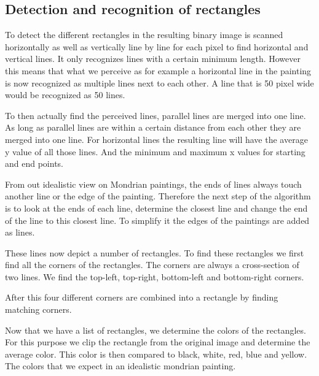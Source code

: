 \subsection{Detection and recognition of rectangles}

To detect the different rectangles in the resulting binary image is scanned
horizontally as well as vertically line by line for each pixel to find horizontal
and vertical lines. It only recognizes lines with a certain minimum length.
However this means that what we perceive as for example a horizontal line in the
painting is now recognized as multiple lines next to each other. A line that is
50 pixel wide would be recognized as 50 lines.

To then actually find the perceived lines, parallel lines are merged into one line.
As long as parallel lines are within a certain distance from each other they are
merged into one line. For horizontal lines the resulting line will have the average
y value of all those lines. And the minimum and maximum x values for starting and end
points.

From out idealistic view on Mondrian paintings, the ends of lines always touch
another line or the edge of the painting. Therefore the next step of the algorithm
is to look at the ends of each line, determine the closest line and change the
end of the line to this closest line. To simplify it the edges of the paintings
are added as lines.

These lines now depict a number of rectangles. To find these rectangles we
first find all the corners of the rectangles. The corners are always a cross-section
of two lines. We find the top-left, top-right, bottom-left and bottom-right corners.

After this four different corners are combined into a rectangle by finding matching
corners.

Now that we have a list of rectangles, we determine the colors of the rectangles.
For this purpose we clip the rectangle from the original image and determine the
average color. This color is then compared to black, white, red, blue and yellow.
The colors that we expect in an idealistic mondrian painting.
